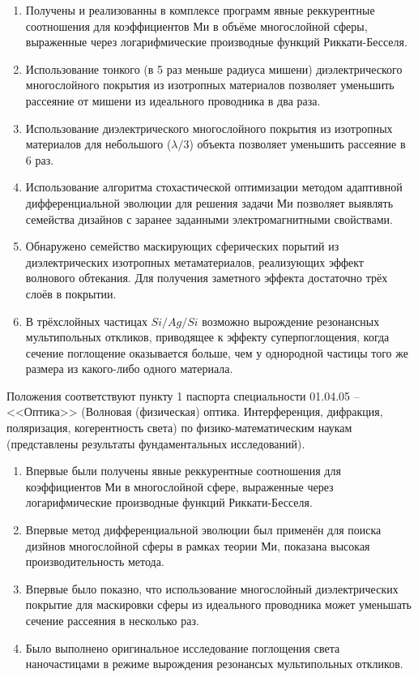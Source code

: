\begin{enumerate}
  \item Получены и реализованны в комплексе программ явные
    реккурентные соотношения для коэффициентов Ми в объёме
    многослойной сферы, выраженные через логарифмические производные
    функций Риккати-Бесселя. %
  \item Использование тонкого (в 5 раз меньше радиуса мишени)
    диэлектрического многослойного покрытия из изотропных материалов
    позволяет уменьшить рассеяние от мишени из идеального проводника в
    два раза.
  \item Использование диэлектрического многослойного покрытия из
    изотропных материалов для небольшого ($\lambda/3$) объекта
    позволяет уменьшить рассеяние в 6 раз.
  \item Использование алгоритма стохастической оптимизации методом
    адаптивной дифференциальной эволюции для решения задачи Ми
    позволяет выявлять семейства дизайнов с заранее заданными
    электромагнитными свойствами.
  \item Обнаружено семейство маскирующих сферических порытий из
    диэлектрических изотропных метаматериалов, реализующих эффект
    волнового обтекания.  Для получения заметного эффекта достаточно
    трёх слоёв в покрытии.
  \item В трёхслойных частицах $Si/Ag/Si$ возможно вырождение
    резонансных мультипольных откликов, приводящее к эффекту
    суперпоглощения, когда сечение поглощение оказывается больше, чем
    у однородной частицы того же размера из какого-либо одного материала. 
  \end{enumerate}

Положения соответствуют пункту 1 паспорта специальности 01.04.05 --
<<Оптика>> (Волновая (физическая) оптика. Интерференция, дифракция,
поляризация, когерентность света) по физико-математическим
наукам (представлены результаты фундаментальных исследований).

\novelty
\begin{enumerate}
  \item Впервые были получены явные реккурентные соотношения для
    коэффициентов Ми в многослойной сфере, выраженные через
    логарифмические производные функций Риккати-Бесселя. 
  \item Впервые метод дифференциальной эволюции был применён для
    поиска дизйнов многослойной сферы в рамках теории Ми,
    показана высокая производительность метода.
  \item Впервые было показно, что использование многослойный
    диэлектрических покрытие для маскировки сферы из идеального
    проводника может уменьшать сечение рассеяния в несколько раз.
  \item Было выполнено оригинальное исследование поглощения света
    наночастицами в режиме вырождения резонансых мультипольных откликов.
\end{enumerate}

